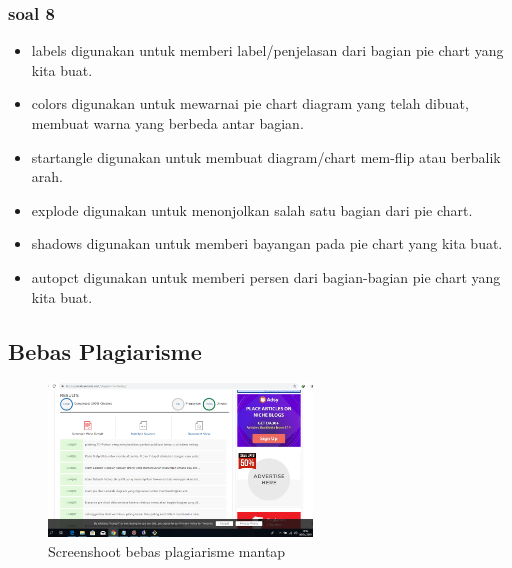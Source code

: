 \subsubsection{soal 8}
\begin{itemize}
\item labels digunakan untuk memberi label/penjelasan dari bagian pie chart yang kita buat.
\item colors digunakan untuk mewarnai pie chart diagram yang telah dibuat, membuat warna yang berbeda antar bagian.
\item startangle digunakan untuk membuat diagram/chart mem-flip atau berbalik arah.
\item explode digunakan untuk menonjolkan salah satu bagian dari pie chart.
\item shadows digunakan untuk memberi bayangan pada pie chart yang kita buat.
\item autopct digunakan untuk memberi persen dari bagian-bagian pie chart yang kita buat.
\end{itemize}

\subsection{Bebas Plagiarisme}
\begin{figure}[H]
\centering
\includegraphics[width=7cm]{figures/6/1174009/plagiaris.png}
\caption{Screenshoot bebas plagiarisme mantap}
\label{dwiyul}
\end{figure}




